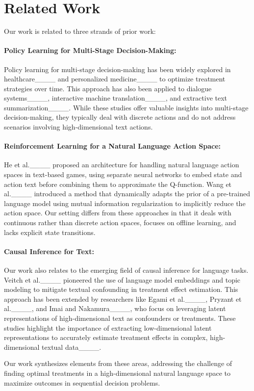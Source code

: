 \section{Related Work}
Our work is related to three strands of prior work:

\paragraph{Policy Learning for Multi-Stage Decision-Making: } 
Policy learning for multi-stage decision-making has been widely explored in healthcare____ and personalized medicine____ to optimize treatment strategies over time. This approach has also been applied to dialogue systems____, interactive machine translation____, and extractive text summarization____. While these studies offer valuable insights into multi-stage decision-making, they typically deal with discrete actions and do not address scenarios involving high-dimensional text actions.

\paragraph{Reinforcement Learning for a Natural Language Action Space: }
He et al.____ proposed an architecture for handling natural language action spaces in text-based games, using separate neural networks to embed state and action text before combining them to approximate the Q-function. Wang et al.____ introduced a method that dynamically adapts the prior of a pre-trained language model using mutual information regularization to implicitly reduce the action space. Our setting differs from these approaches in that it deals with continuous rather than discrete action spaces, focuses on offline learning, and lacks explicit state transitions.

\paragraph{Causal Inference for Text: } 
Our work also relates to the emerging field of causal inference for language tasks. Veitch et al.____ pioneered the use of language model embeddings and topic modeling to mitigate textual confounding in treatment effect estimation. This approach has been extended by researchers like Egami et al.____, Pryzant et al.____, and Imai and Nakamura____, who focus on leveraging latent representations of high-dimensional text as confounders or treatments. These studies highlight the importance of extracting low-dimensional latent representations to accurately estimate treatment effects in complex, high-dimensional textual data____.

Our work synthesizes elements from these areas, addressing the challenge of finding optimal treatments in a high-dimensional natural language space to maximize outcomes in sequential decision problems.
